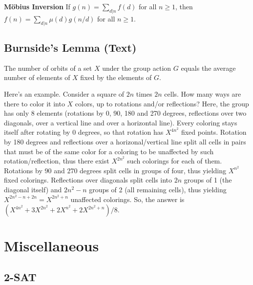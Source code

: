 \documentclass[12pt]{extarticle}
\begin{document}
\begin{multicols*}{2}
\textbf{M\"obius Inversion}
If $g(n) = \sum_{d|n} f(d)$ for all $n \ge 1$, then
$f(n) = \sum_{d|n} \mu(d)g(n/d)$ for all $n \ge 1$.


\subsection{Burnside's Lemma (Text)} %
The number of orbits of a set $X$ under the group action $G$ equals the average
number of elements of $X$ fixed by the elements of $G$.

Here's an example. Consider a square of $2n$ times $2n$ cells. How many ways
are there to color it into $X$ colors, up to rotations and/or reflections?
Here, the group has only 8 elements (rotations by 0, 90, 180 and 270 degrees,
reflections over two diagonals, over a vertical line and over a horizontal
line). Every coloring stays itself after rotating by 0 degrees, so that
rotation has $X^{4n^2}$ fixed points. Rotation by 180 degrees and reflections
over a horizonal/vertical line split all cells in pairs that must be of the
same color for a coloring to be unaffected by such rotation/reflection, thus
there exist $X^{2n^2}$ such colorings for each of them. Rotations by 90 and 270
degrees split cells in groups of four, thus yielding $X^{n^2}$ fixed colorings.
Reflections over diagonals split cells into $2n$ groups of 1 (the diagonal
itself) and $2n^2-n$ groups of 2 (all remaining cells), thus yielding
$X^{2n^2-n+2n}=X^{2n^2+n}$ unaffected colorings.  So, the answer is
$(X^{4n^2}+3X^{2n^2}+2X^{n^2}+2X^{2n^2+n})/8$.

\section{Miscellaneous}
\subsection{2-SAT} %


\end{multicols*}
\end{document}
